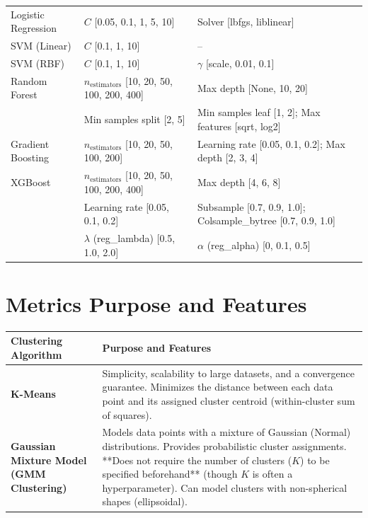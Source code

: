 \documentclass{article}
\begin{document}
{{{{{{{\begin{table}[h!]
\begin{tabular}{p{} p{} p{}}
Logistic Regression &
$C$ [0.05, 0.1, 1, 5, 10] &
Solver [lbfgs, liblinear] \\

SVM (Linear) &
$C$ [0.1, 1, 10] &
-- \\

SVM (RBF) &
$C$ [0.1, 1, 10] &
$\gamma$ [scale, 0.01, 0.1] \\

Random Forest &
$n_{\text{estimators}}$ [10, 20, 50, 100, 200, 400] &
Max depth [None, 10, 20] \\
&
Min samples split [2, 5] &
Min samples leaf [1, 2];    Max features [sqrt, log2] \\

Gradient Boosting &
$n_{\text{estimators}}$ [10, 20, 50, 100, 200] &
Learning rate [0.05, 0.1, 0.2]; Max depth [2, 3, 4] \\

XGBoost &
$n_{\text{estimators}}$ [10, 20, 50, 100, 200, 400] &
Max depth [4, 6, 8] \\
&
Learning rate [0.05, 0.1, 0.2] &
Subsample [0.7, 0.9, 1.0]; Colsample\_bytree [0.7, 0.9, 1.0] \\
&
$\lambda$ (reg\_lambda) [0.5, 1.0, 2.0] &
$\alpha$ (reg\_alpha) [0, 0.1, 0.5] \\

\bottomrule
\end{tabular}
\end{table}

\newpage

\renewcommand{\thesubsection}{\thesection.\arabic{subsection}}

\newpage




\section{Metrics Purpose and Features}

\begin{tabular}{|p{4.5cm}|p{8.5cm}|}
\hline
\textbf{Clustering Algorithm} & \textbf{Purpose and Features} \\
\hline
\textbf{K-Means} & Simplicity, scalability to large datasets, and a convergence guarantee. Minimizes the distance between each data point and its assigned cluster centroid (within-cluster sum of squares). \\

\hline
\textbf{Gaussian Mixture Model (GMM Clustering)} & Models data points with a mixture of Gaussian (Normal) distributions. Provides probabilistic cluster assignments. **Does not require the number of clusters ($K$) to be specified beforehand** (though $K$ is often a hyperparameter). Can model clusters with non-spherical shapes (ellipsoidal). \\
\hline
\end{tabular}

}}}}}}}
\end{document}

